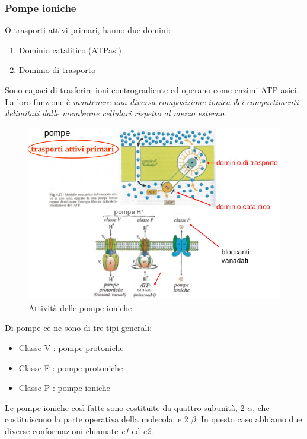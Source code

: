 \documentclass[a4paper,12pt]{article}
\begin{document}
\subsubsection{Pompe ioniche}
O trasporti attivi primari, hanno due domini: 
\begin{enumerate}
\item{Dominio catalitico (ATPasi)}
\item{Dominio di trasporto}
\end{enumerate}
Sono capaci di trasferire ioni controgradiente ed operano come enzimi ATP-asici. La loro funzione è \emph{mantenere una diversa composizione ionica dei compartimenti delimitati dalle membrane cellulari rispetto al mezzo esterno}.
\begin{figure}[H]
\centering
\includegraphics[scale=0.4]{immagine/pompe.jpg}
\caption{Attività delle pompe ioniche}
\end{figure}

Di pompe ce ne sono di tre tipi generali:
\begin{itemize}
\item{Classe V : pompe protoniche}
\item{Classe F : pompe protoniche}
\item{Classe P : pompe ioniche}
\end{itemize}

Le pompe ioniche così fatte sono costituite da quattro subunità, 2 $\alpha$, che costituiscono la parte operativa della molecola, e 2 $\beta$.
In questo caso abbiamo due diverse conformazioni chiamate \emph{e1} ed \emph{e2}.
\end{document}
